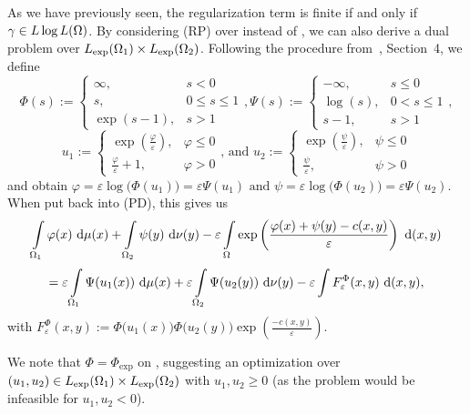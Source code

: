 As we have previously seen, the regularization term is finite if and only if $\gamma \in \LLL$. By considering (RP) over \LLL{} instead of \TP{\mu}{\nu}, we can also derive a dual problem over $\Lexp[\Omega_1] \times \Lexp[\Omega_2]$. Following the procedure from~\cite{Cla2021}, Section~4, we define
\[ \Phi(s) := \begin{cases}
	\infty, & s < 0 \\
	s, & 0 \le s \le 1 \\
	\exp(s - 1), & s > 1
\end{cases}, \Psi(s) := \begin{cases}
	- \infty, & s \le 0 \\
	\log(s), & 0 < s \le 1 \\
	s - 1, & s > 1
\end{cases}, \]
\[ u_1 := \begin{cases}
	\exp \left( \frac{\varphi}{\varepsilon} \right), & \varphi \le 0 \\
	\frac{\varphi}{\varepsilon} + 1, & \varphi > 0
\end{cases} \text{, and } u_2 := \begin{cases}
	\exp \left( \frac{\psi}{\varepsilon} \right), & \psi \le 0 \\
	\frac{\psi}{\varepsilon}, & \psi > 0
\end{cases} \]
and obtain $\varphi = \varepsilon \log \big( \Phi(u_1) \big) = \varepsilon \Psi(u_1) \text{ and } \psi = \varepsilon \log \big( \Phi(u_2) \big) = \varepsilon \Psi(u_2)$. When put back into (PD), this gives us
\[ \int\limits_{\Omega_1} \varphi(x)~\Dx{\mu} + \int\limits_{\Omega_2} \psi(y)~\Dx[y]{\nu} - \varepsilon \int\limits_{\Omega} \exp \left( \frac{\varphi(x) + \psi(y) - c(x, y)}{\varepsilon} \right)~\Dx[x, y]{} \]
\[ = \varepsilon \int\limits_{\Omega_1} \Psi(u_1(x))~\Dx{\mu} + \varepsilon \int\limits_{\Omega_2} \Psi(u_2(y))~\Dx[y]{\nu} - \varepsilon \int\limits F_{\varepsilon}^{\Phi}(x, y)~\Dx[x, y]{}, \]
with $F_{\varepsilon}^{\Phi}(x, y) := \Phi\big( u_1(x) \big) \Phi\big( u_2(y) \big) \exp\left( \frac{-c(x, y)}{\varepsilon} \right)$.


We note that $\Phi = \Phi_{\exp}$ on \RZero, suggesting an optimization over ${(u_1, u_2)} \in \Lexp[\Omega_1] \times \Lexp[\Omega_2]$ with $u_1, u_2 \ge 0$ (as the problem would be infeasible for $u_1, u_2 < 0$).

